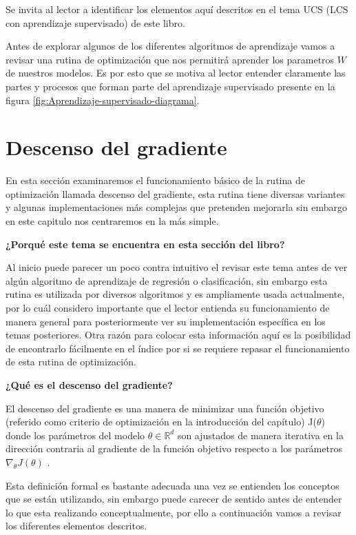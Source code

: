 \documentclass[11pt,fleqn]{book} %
\begin{document}
Se invita al lector a identificar los elementos aquí descritos en el tema UCS (LCS con aprendizaje supervisado) de este libro.

Antes de explorar algunos de los diferentes algoritmos de aprendizaje vamos a revisar una rutina de optimización que nos permitirá aprender los parametros $W$ de nuestros modelos. Es por esto que se motiva al lector entender claramente las partes y procesos que forman parte del aprendizaje supervisado presente en la figura \ref{fig:Aprendizaje-supervisado-diagrama}.

\clearpage

\section{Descenso del gradiente} 

En esta sección examinaremos el funcionamiento básico de la rutina de optimización llamada descenso del gradiente, esta rutina tiene diversas variantes y algunas implementaciones más complejas que pretenden mejorarla sin embargo en este capitulo nos centraremos en la más simple.

\textbf{¿Porqué este tema se encuentra en esta sección del libro?}

Al inicio puede parecer un poco contra intuitivo el revisar este tema antes de ver algún algoritmo de aprendizaje de regresión o clasificación, sin embargo esta rutina es utilizada por diversos algoritmos y es ampliamente usada actualmente, por lo cuál considero importante que el lector entienda su funcionamiento de manera general para posteriormente ver su implementación específica en los temas posteriores. Otra razón para colocar esta información aquí es la posibilidad de encontrarlo fácilmente en el índice por si se requiere repasar el funcionamiento de esta rutina de optimización.

\textbf{¿Qué es el descenso del gradiente?}

El descenso del gradiente es una manera de minimizar una función objetivo (referido como criterio de optimización en la introducción del capítulo) J($\theta$) donde los parámetros del modelo $\theta \in \mathbb{R}^{d}$ son ajustados de manera iterativa en la dirección contraria al gradiente de la función objetivo respecto a los parámetros $\nabla _{\theta} J(\theta)$ \cite{ruder2017overview}.

Esta definición formal es bastante adecuada una vez se entienden los conceptos que se están utilizando, sin embargo puede carecer de sentido antes de entender lo que esta realizando conceptualmente, por ello a continuación vamos a revisar los diferentes elementos descritos.
\end{document}
